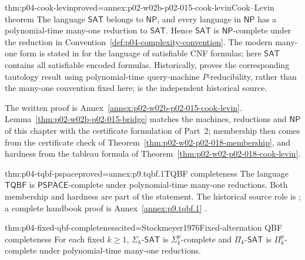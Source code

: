 \begin{hbtheorem}{thm:p04-cook-levin}{proved=annex:p02-w02b-p02-015-cook-levin}{Cook--Levin theorem}
The language \(\mathsf{SAT}\) belongs to \(\mathsf{NP}\), and every language
in \(\mathsf{NP}\) has a polynomial-time many-one reduction to
\(\mathsf{SAT}\).  Hence \(\mathsf{SAT}\) is \(\mathsf{NP}\)-complete under
the reduction in Convention~\ref{def:p04-complexity-convention}.  The
modern many-one form is stated in \cite[thm.~2.10]{AroraBarak2009} for the
language of satisfiable CNF formulas; here \(\mathsf{SAT}\) contains all
satisfiable encoded formulas.
Historically, \textcite{Cook1971} proves the corresponding tautology result
using polynomial-time query-machine \(P\)-reducibility, rather than the
many-one convention fixed here; \textcite{Levin1973} is the independent
historical source.
\end{hbtheorem}

The written proof is Annex~\ref{annex:p02-w02b-p02-015-cook-levin}.
Lemma~\ref{thm:p02-w02b-p02-015-bridge} matches the machines, reductions and
\(\mathsf{NP}\) of this chapter with the certificate formulation of Part~2;
membership then comes from the certificate check of
Theorem~\ref{thm:p02-w02-p02-018-membership}, and hardness from the tableau
formula of Theorem~\ref{thm:p02-w02-p02-018-cook-levin}.

\begin{hbtheorem}{thm:p04-tqbf-pspace}{proved=annex:p9.tqbf.1}{TQBF completeness}
The language \(\mathsf{TQBF}\) is \(\mathsf{PSPACE}\)-complete under
polynomial-time many-one reductions.  Both membership and hardness are part
of the statement.  The historical source role is
\textcite{StockmeyerMeyer1973}; a complete handbook proof is
Annex~\ref{annex:p9.tqbf.1} \cite[thm.~4.11]{AroraBarak2009}.
\end{hbtheorem}

\begin{hbtheorem}{thm:p04-fixed-qbf-completeness}{cited=Stockmeyer1976}{Fixed-alternation QBF completeness}
For each fixed \(k\geq1\),
\(\Sigma_k\text{-}\mathsf{SAT}\) is \(\Sigma^p_k\)-complete and
\(\Pi_k\text{-}\mathsf{SAT}\) is \(\Pi^p_k\)-complete under
polynomial-time many-one reductions.
\end{hbtheorem}

